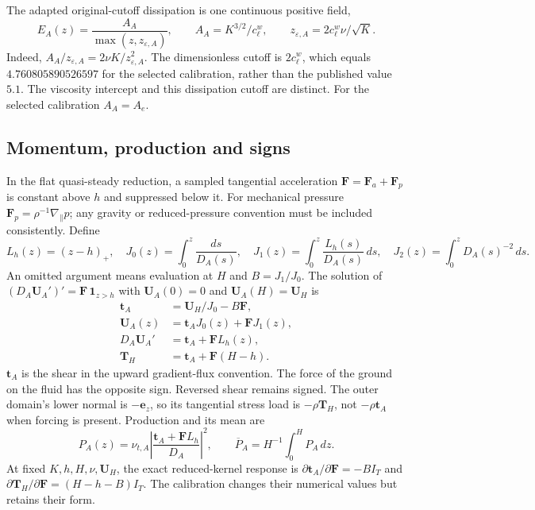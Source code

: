 \documentclass[11pt,a4paper]{article}
\numberwithin{equation}{section}
\begin{document}
The adapted original-cutoff dissipation is one continuous positive field,
\begin{equation}
 \boxed{E_A(z)=\frac{A_A}{\max(z,z_{\varepsilon,A})},\qquad
 A_A=K^{3/2}/c_\ell^w,\qquad
 z_{\varepsilon,A}=2c_\ell^w\nu/\sqrt K.}
 \label{eq:wj-wall-original-E}
\end{equation}
Indeed, $A_A/z_{\varepsilon,A}=2\nu K/z_{\varepsilon,A}^2$.
The dimensionless cutoff is $2c_\ell^w$, which equals
$4.760805890526597$ for the selected calibration, rather than the
published value $5.1$. The viscosity intercept and this dissipation
cutoff are distinct. For the selected calibration $A_A=A_e$.

\subsection{Momentum, production and signs}

In the flat quasi-steady reduction, a sampled tangential acceleration
$\bm F=\bm F_a+\bm F_p$ is constant above $h$ and suppressed below it.
For mechanical pressure $\bm F_p=\rho^{-1}\nabla_\parallel p$; any
gravity or reduced-pressure convention must be included consistently.
Define
\begin{equation}
 L_h(z)=(z-h)_+,\quad
 J_0(z)=\int_0^z\frac{ds}{D_A(s)},\quad
 J_1(z)=\int_0^z\frac{L_h(s)}{D_A(s)}\,ds,\quad
 J_2(z)=\int_0^zD_A(s)^{-2}\,ds.
 \label{eq:wj-wall-integrals}
\end{equation}
An omitted argument means evaluation at $H$ and $B=J_1/J_0$.
The solution of $(D_A\bm U_A')'=\bm F\,\mathbf1_{z>h}$ with
$\bm U_A(0)=0$ and $\bm U_A(H)=\bm U_H$ is
\begin{equation}
 \boxed{\begin{aligned}
 \bm t_A&=\bm U_H/J_0-B\bm F,\\
 \bm U_A(z)&=\bm t_AJ_0(z)+\bm FJ_1(z),\\
 D_A\bm U_A'&=\bm t_A+\bm F L_h(z),\\
 \bm T_H&=\bm t_A+\bm F(H-h).
 \end{aligned}}
 \label{eq:wj-wall-momentum}
\end{equation}
$\bm t_A$ is the shear in the upward gradient-flux convention. The force
of the ground on the fluid has the opposite sign. Reversed shear remains
signed. The outer domain's lower normal is $-\bm e_z$, so its tangential
stress load is $-\rho\bm T_H$, not $-\rho\bm t_A$ when forcing is present.
Production and its mean are
\begin{equation}
 P_A(z)=\nu_{t,A}\left|\frac{\bm t_A+\bm F L_h}{D_A}\right|^2,
 \qquad \overline P_A=H^{-1}\int_0^H P_A\,dz.
 \label{eq:wj-wall-production}
\end{equation}
At fixed $K,h,H,\nu,\bm U_H$, the exact reduced-kernel response is
$\partial\bm t_A/\partial\bm F=-B I_T$ and
$\partial\bm T_H/\partial\bm F=(H-h-B)I_T$.
The calibration changes their numerical values but retains their form.
\end{document}
